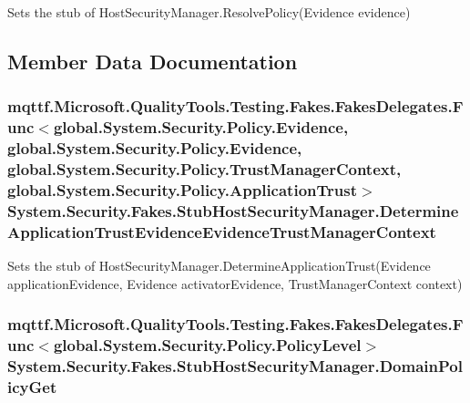 Sets the stub of Host\-Security\-Manager.\-Resolve\-Policy(\-Evidence evidence)



\subsection{Member Data Documentation}
\hypertarget{class_system_1_1_security_1_1_fakes_1_1_stub_host_security_manager_a1718add9dc02d9df8b1a7dcad6a16930}{
\subsubsection[{Determine\-Application\-Trust\-Evidence\-Evidence\-Trust\-Manager\-Context}]{\setlength{\rightskip}{0pt plus 5cm}mqttf.\-Microsoft.\-Quality\-Tools.\-Testing.\-Fakes.\-Fakes\-Delegates.\-Func$<$global.\-System.\-Security.\-Policy.\-Evidence, global.\-System.\-Security.\-Policy.\-Evidence, global.\-System.\-Security.\-Policy.\-Trust\-Manager\-Context, global.\-System.\-Security.\-Policy.\-Application\-Trust$>$ System.\-Security.\-Fakes.\-Stub\-Host\-Security\-Manager.\-Determine\-Application\-Trust\-Evidence\-Evidence\-Trust\-Manager\-Context}}\label{class_system_1_1_security_1_1_fakes_1_1_stub_host_security_manager_a1718add9dc02d9df8b1a7dcad6a16930}


Sets the stub of Host\-Security\-Manager.\-Determine\-Application\-Trust(\-Evidence application\-Evidence, Evidence activator\-Evidence, Trust\-Manager\-Context context)

\hypertarget{class_system_1_1_security_1_1_fakes_1_1_stub_host_security_manager_a3608d0b2f3e10099368873287d7c522b}{
\subsubsection[{Domain\-Policy\-Get}]{\setlength{\rightskip}{0pt plus 5cm}mqttf.\-Microsoft.\-Quality\-Tools.\-Testing.\-Fakes.\-Fakes\-Delegates.\-Func$<$global.\-System.\-Security.\-Policy.\-Policy\-Level$>$ System.\-Security.\-Fakes.\-Stub\-Host\-Security\-Manager.\-Domain\-Policy\-Get}}\label{class_system_1_1_security_1_1_fakes_1_1_stub_host_security_manager_a3608d0b2f3e10099368873287d7c522b}


